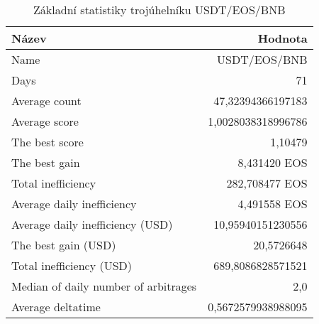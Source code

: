 \begin{table}\centering
\caption{Základní statistiky trojúhelníku USDT/EOS/BNB}
\label{USDTEOSBNB_stats}
\begin{tabular}{|| l | r ||}
\hline Název & Hodnota \\ 
\hline\hline Name & USDT/EOS/BNB \\ 
\hline Days & 71 \\ 
\hline Average count & 47,32394366197183 \\ 
\hline Average score & 1,0028038318996786 \\ 
\hline The best score & 1,10479 \\ 
\hline The best gain & 8,431420 EOS \\ 
\hline Total inefficiency & 282,708477 EOS \\ 
\hline Average daily inefficiency & 4,491558 EOS \\ 
\hline Average daily inefficiency (USD) & 10,95940151230556 \\ 
\hline The best gain (USD) & 20,5726648 \\ 
\hline Total inefficiency (USD) & 689,8086828571521 \\ 
\hline Median of daily number of arbitrages & 2,0 \\ 
\hline Average deltatime & 0,5672579938988095 \\ 
\hline
\end{tabular}
\end{table}